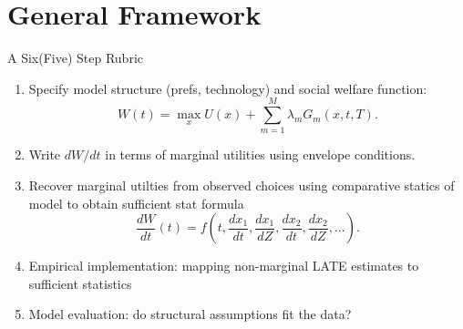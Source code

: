 \documentclass{beamer}
\begin{document}
\section{General Framework}
\begin{frame}[shrink]
	\transfade %
	\tableofcontents[sectionstyle=show/shaded,subsectionstyle=show/shaded/hide]
	\addtocounter{framenumber}{-1}
\end{frame}
\begin{frame}{A Six(Five) Step Rubric}
	\begin{enumerate}
		\item Specify model structure (prefs, technology) and social welfare function:
		\begin{equation}\nonumber
			W(t) = \max_x U(x) + \sum_{m=1}^M\lambda_mG_m(x,t,T).
		\end{equation}
		\item Write $dW/dt$ in terms of marginal utilities using envelope conditions.
		\item Recover marginal utilties from observed choices using comparative statics of model to obtain sufficient stat formula
		\begin{equation}\nonumber
			\frac{dW}{dt}(t) = f\left(t,\frac{dx_1}{dt},\frac{dx_1}{dZ},\frac{dx_2}{dt},\frac{dx_2}{dZ},... \right).
		\end{equation}
		\item Empirical implementation: mapping non-marginal LATE estimates to sufficient statistics
		\item Model evaluation: do structural assumptions fit the data?
	\end{enumerate}
\end{frame}
\end{document}
